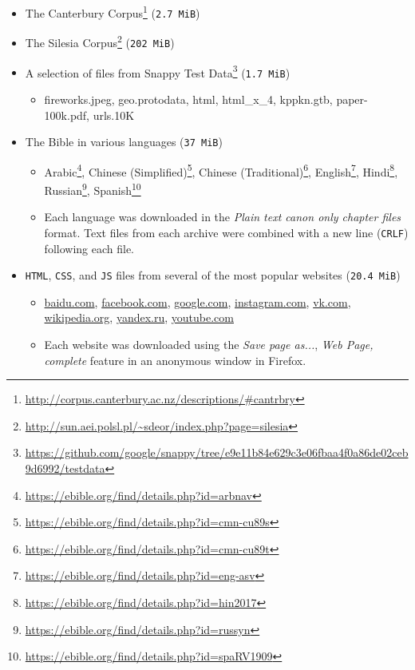 \documentclass[english,master,dept460,male,cpp,cpdeclaration]{diploma}
\newcommand{\nosep}{\itemsep0em}
\begin{document}
	\begin{itemize} \nosep
		\item The Canterbury Corpus\footnote{\url{http://corpus.canterbury.ac.nz/descriptions/\#cantrbry}} (\verb|2.7 MiB|)
		\item The Silesia Corpus\footnote{\url{http://sun.aei.polsl.pl/~sdeor/index.php?page=silesia}} (\verb|202 MiB|)
		\item A selection of files from Snappy Test Data\footnote{\url{https://github.com/google/snappy/tree/e9e11b84e629c3e06fbaa4f0a86de02ceb9d6992/testdata}} (\verb|1.7 MiB|)
		\begin{itemize} \nosep
			\item fireworks.jpeg, geo.protodata, html, html\_x\_4, kppkn.gtb, paper-100k.pdf, urls.10K
		\end{itemize}
		\item The Bible in various languages (\verb|37 MiB|)
		\begin{itemize} \nosep
			\item Arabic\footnote{\url{https://ebible.org/find/details.php?id=arbnav}},
			      Chinese (Simplified)\footnote{\url{https://ebible.org/find/details.php?id=cmn-cu89s}},
			      Chinese (Traditional)\footnote{\url{https://ebible.org/find/details.php?id=cmn-cu89t}},
			      English\footnote{\url{https://ebible.org/find/details.php?id=eng-asv}},
			      Hindi\footnote{\url{https://ebible.org/find/details.php?id=hin2017}},
			      Russian\footnote{\url{https://ebible.org/find/details.php?id=russyn}},
			      Spanish\footnote{\url{https://ebible.org/find/details.php?id=spaRV1909}}
			\item Each language was downloaded in the \emph{Plain text canon only chapter files} format. Text files from each archive were combined with a new line (\verb|CRLF|) following each file.
		\end{itemize}
		\item \verb|HTML|, \verb|CSS|, and \verb|JS| files from several of the most popular websites (\verb|20.4 MiB|)
		\begin{itemize} \nosep
			\item \url{baidu.com}, \url{facebook.com}, \url{google.com}, \url{instagram.com}, \url{vk.com}, \url{wikipedia.org}, \url{yandex.ru}, \url{youtube.com}
			\item Each website was downloaded using the \emph{Save page as...}, \emph{Web Page, complete} feature in an anonymous window in Firefox.
		\end{itemize}
	\end{itemize}
	
\end{document}
